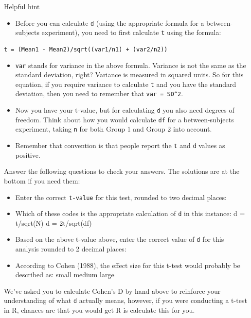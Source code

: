 \documentclass[]{book}
\providecommand{\tightlist}{%
  \setlength{\itemsep}{0pt}\setlength{\parskip}{0pt}}
\begin{document}
Helpful hint

\begin{itemize}
\tightlist
\item
  Before you can calculate \texttt{d} (using the appropriate formula for a between-subjects experiment), you need to first calculate \texttt{t} using the formula:
\end{itemize}

\texttt{t\ =\ (Mean1\ -\ Mean2)/sqrt((var1/n1)\ +\ (var2/n2))}

\begin{itemize}
\tightlist
\item
  \texttt{var} stands for variance in the above formula. Variance is not the same as the standard deviation, right? Variance is measured in squared units. So for this equation, if you require variance to calculate \texttt{t} and you have the standard deviation, then you need to remember that \texttt{var\ =\ SD\^{}2}.
\item
  Now you have your t-value, but for calculating \texttt{d} you also need degrees of freedom. Think about how you would calculate \texttt{df} for a between-subjects experiment, taking \texttt{n} for both Group 1 and Group 2 into account.
\item
  Remember that convention is that people report the \texttt{t} and \texttt{d} values as positive.
\end{itemize}

Answer the following questions to check your answers. The solutions are at the bottom if you need them:

\begin{itemize}
\item
  Enter the correct \texttt{t-value} for this test, rounded to two decimal places: 
\item
  Which of these codes is the appropriate calculation of \texttt{d} in this instance: d = t/sqrt(N) d = 2t/sqrt(df)
\item
  Based on the above t-value above, enter the correct value of \texttt{d} for this analysis rounded to 2 decimal places: 
\item
  According to Cohen (1988), the effect size for this t-test would probably be described as: small medium large
\end{itemize}

We've asked you to calculate Cohen's D by hand above to reinforce your understanding of what \texttt{d} actually means, however, if you were conducting a t-test in R, chances are that you would get R is calculate this for you.
\end{document}
